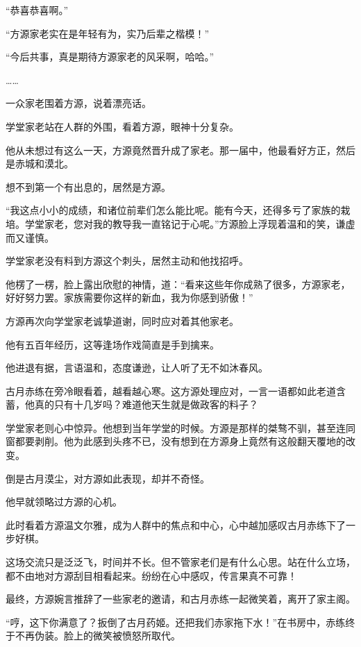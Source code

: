 
\begin{this_body}

“恭喜恭喜啊。”

“方源家老实在是年轻有为，实乃后辈之楷模！”

“今后共事，真是期待方源家老的风采啊，哈哈。”

……

一众家老围着方源，说着漂亮话。

学堂家老站在人群的外围，看着方源，眼神十分复杂。

他从未想过有这么一天，方源竟然晋升成了家老。那一届中，他最看好方正，然后是赤城和漠北。

想不到第一个有出息的，居然是方源。

“我这点小小的成绩，和诸位前辈们怎么能比呢。能有今天，还得多亏了家族的栽培。学堂家老，您对我的教导我一直铭记于心呢。”方源脸上浮现着温和的笑，谦虚而又谨慎。

学堂家老没有料到方源这个刺头，居然主动和他找招呼。

他楞了一楞，脸上露出欣慰的神情，道：“看来这些年你成熟了很多，方源家老，好好努力罢。家族需要你这样的新血，我为你感到骄傲！”

方源再次向学堂家老诚挚道谢，同时应对着其他家老。

他有五百年经历，这等逢场作戏简直是手到擒来。

他进退有据，言语温和，态度谦逊，让人听了无不如沐春风。

古月赤练在旁冷眼看着，越看越心寒。这方源处理应对，一言一语都如此老道含蓄，他真的只有十几岁吗？难道他天生就是做政客的料子？

学堂家老则心中惊异。他想到当年学堂的时候。方源是那样的桀骜不驯，甚至连同窗都要剥削。他为此感到头疼不已，没有想到在方源身上竟然有这般翻天覆地的改变。

倒是古月漠尘，对方源如此表现，却并不奇怪。

他早就领略过方源的心机。

此时看着方源温文尔雅，成为人群中的焦点和中心，心中越加感叹古月赤练下了一步好棋。

这场交流只是泛泛飞，时间并不长。但不管家老们是有什么心思。站在什么立场，都不由地对方源刮目相看起来。纷纷在心中感叹，传言果真不可靠！

最终，方源婉言推辞了一些家老的邀请，和古月赤练一起微笑着，离开了家主阁。

“哼，这下你满意了？扳倒了古月药姬。还把我们赤家拖下水！”在书房中，赤练终于不再伪装。脸上的微笑被愤怒所取代。


\end{this_body}

